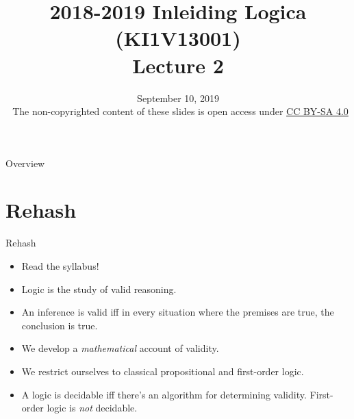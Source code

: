 \documentclass[../slides.tex]{subfiles}
\title{2018-2019 Inleiding Logica (KI1V13001) \\ Lecture 2}
\date{September 10, 2019\\[2ex] {\tiny \textcopyright~The non-copyrighted content of these slides is open access under \href{https://creativecommons.org/licenses/by-sa/4.0/}{CC BY-SA 4.0}}}
\begin{document}
\setcounter{framenumber}{24}
\begin{frame}
	\maketitle
\end{frame}

\begin{frame}{Overview}
\tableofcontents
\end{frame}

\section{Rehash}
\begin{frame}{Rehash}

\begin{itemize}

	\item \alert{Read the syllabus!}
	
	\item Logic is the study of valid reasoning.
	
	\item An inference is valid iff in every situation where the premises are true, the conclusion is true.
	
	\item \alert{We develop a \emph{mathematical} account of validity.}
	
	\item We restrict ourselves to classical propositional and first-order logic.
	
	\item A logic is decidable iff there's an algorithm for determining validity. First-order logic is \emph{not} decidable.

\end{itemize}

\end{frame}
\end{document}

